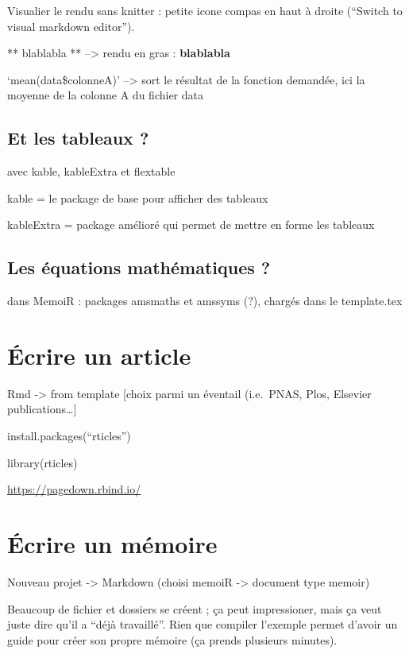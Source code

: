 \documentclass[
  12pt,
  american,
  a4paper,
  extrafontsizes,onecolumn,openright
  ]{memoir}
\begin{document}
Visualier le rendu sans knitter : petite icone compas en haut à droite (``Switch to visual markdown editor'').

** blablabla ** --\textgreater{} rendu en gras : \textbf{blablabla}

`mean(data\$colonneA)' --\textgreater{} sort le résultat de la fonction demandée, ici la moyenne de la colonne A du fichier data

\hypertarget{et-les-tableaux}{%
\subsection{Et les tableaux ?}\label{et-les-tableaux}}

avec kable, kableExtra et flextable

kable = le package de base pour afficher des tableaux

kableExtra = package amélioré qui permet de mettre en forme les tableaux

\hypertarget{les-uxe9quations-mathuxe9matiques}{%
\subsection{Les équations mathématiques ?}\label{les-uxe9quations-mathuxe9matiques}}

dans MemoiR : packages amsmaths et amssyms (?), chargés dans le template.tex

\hypertarget{uxe9crire-un-article}{%
\section{Écrire un article}\label{uxe9crire-un-article}}

Rmd -\textgreater{} from template {[}choix parmi un éventail (i.e.~PNAS, Plos, Elsevier publications\ldots{]}

install.packages(``rticles'')

library(rticles)

\url{https://pagedown.rbind.io/}

\hypertarget{uxe9crire-un-muxe9moire}{%
\section{Écrire un mémoire}\label{uxe9crire-un-muxe9moire}}

Nouveau projet -\textgreater{} Markdown (choisi memoiR -\textgreater{} document type memoir)

Beaucoup de fichier et dossiers se créent ; ça peut impressioner, mais ça veut juste dire qu'il a ``déjà travaillé''. Rien que compiler l'exemple permet d'avoir un guide pour créer son propre mémoire (ça prends plusieurs minutes).
\end{document}
